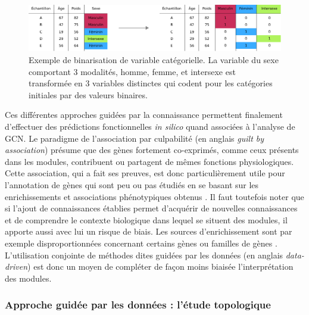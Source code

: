 \begin{figure}
    \centering
    \includegraphics[width=\textwidth]{img/intro/3_coexpr/intro_3_coexpr_binarisation.pdf}
    \caption[Exemple de binarisation de variable catégorielle]{Exemple de binarisation de variable catégorielle. La variable du sexe comportant 3 modalités, homme, femme, et intersexe est transformée en 3 variables distinctes qui codent pour les catégories initiales par des valeurs binaires.}
    \label{fig:binarisation}
\end{figure}

Ces différentes approches guidées par la connaissance permettent finalement d'effectuer des prédictions fonctionnelles \textit{in silico} quand associées à l'analyse de \acrshort{GCN}. Le paradigme de l'association par culpabilité (en anglais \textit{guilt by association}) présume que des gènes fortement co-exprimés, comme ceux présents dans les modules, contribuent ou partagent de mêmes fonctions physiologiques\cite{Ballouz2015}. Cette association, qui a fait ses preuves, est donc particulièrement utile pour l'annotation de gènes qui sont peu ou pas étudiés en se basant sur les enrichissements et associations phénotypiques obtenus \cite{Wolfe2005}. Il faut toutefois noter que si l'ajout de connaissances établies permet d'acquérir de nouvelles connaissances et de comprendre le contexte biologique dans lequel se situent des modules, il apporte aussi avec lui un risque de biais. Les sources d'enrichissement sont par exemple disproportionnées concernant certains gènes ou familles de gènes \cite{Timmons2015Dec}. L'utilisation conjointe de méthodes dites guidées par les données (en anglais \textit{data-driven}) est donc un moyen de compléter de façon moins biaisée l'interprétation des modules.


\subsubsection{Approche guidée par les données : l'étude topologique}

